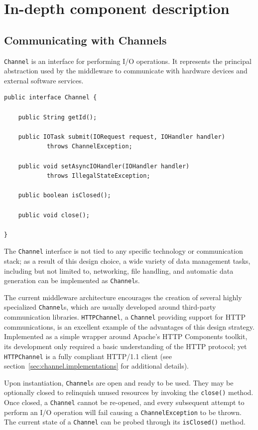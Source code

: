 \chapter{In-depth component description}

\section{Communicating with Channels}

\texttt{Channel} is an interface for performing I/O operations. It represents the principal abstraction used by the middleware to communicate with hardware devices and external software services.

\lstset{language=Java}
\begin{lstlisting}[float,caption=The Channel interface,label={lst:channel}]
public interface Channel {

	public String getId();
	
	public IOTask submit(IORequest request, IOHandler handler)
			throws ChannelException;
	
	public void setAsyncIOHandler(IOHandler handler)
			throws IllegalStateException;
			
	public boolean isClosed();
	
	public void close();
			
}
\end{lstlisting}

The \texttt{Channel} interface is not tied to any specific technology or communication stack; as a result of this design choice, a wide variety of data management tasks, including but not limited to, networking, file handling, and automatic data generation can be implemented as \texttt{Channel}s.

The current middleware architecture encourages the creation of several highly specialized \texttt{Channel}s, which are usually developed around third-party communication libraries. \texttt{HTTPChannel}, a \texttt{Channel} providing support for HTTP communications, is an excellent example of the advantages of this design strategy. Implemented as a simple wrapper around Apache's HTTP Components toolkit, its development only required a basic understanding of the HTTP protocol; yet \texttt{HTTPChannel} is a fully compliant HTTP/1.1 client (see section~\ref{sec:channel.implementations} for additional details).

Upon instantiation, \texttt{Channel}s are open and ready to be used. They may be optionally closed to relinquish unused resources by invoking the \texttt{close()} method. Once closed, a \texttt{Channel} cannot be re-opened, and every subsequent attempt to perform an I/O operation will fail causing a \texttt{ChannelException} to be thrown. The current state of a \texttt{Channel} can be probed through its \texttt{isClosed()} method.

